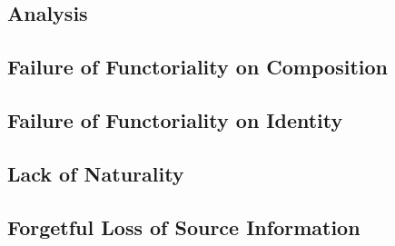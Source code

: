 \documentclass[11pt]{report}
\theoremstyle{definition}
\begin{document}
\begin{mainf}
%
%

\chapter{Analysis}
\label{ch:analysis}


\section{Failure of Functoriality on Composition}
\label{sec:analysis-composition}


\section{Failure of Functoriality on Identity}
\label{sec:analysis-identity}


\section{Lack of Naturality}
\label{sec:analysis-naturality}


\section{Forgetful Loss of Source Information}
\label{sec:analysis-forgetful}


\end{mainf}
\end{document}
